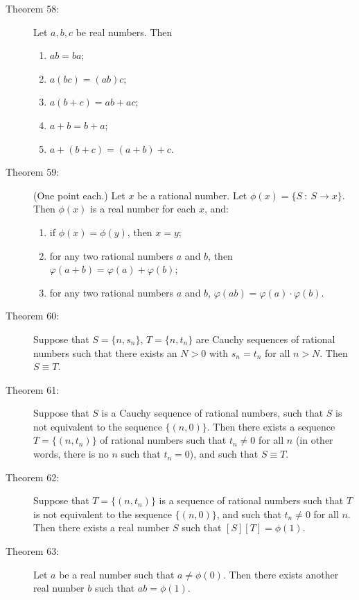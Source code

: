 \documentclass{article}
\begin{document}
\begin{description}
  \item[Theorem 58:] Let $a,b,c$ be real numbers. Then
    \begin{enumerate}[\hspace{1cm}1.]
      \item $ab=ba$; 
      \item $a(bc) = (ab)c$; 
      \item $a(b+c) = ab+ac$; 
      \item $a+b = b+a$; 
      \item $a+(b+c) = (a+b)+c$. 
    \end{enumerate}

  \item[Theorem 59:] (One point each.) Let $x$ be a rational number. Let $\phi(x) = \{ S\ :\ S \rightarrow x \}$. Then $\phi(x)$ is a real number for each $x$, and:
    \begin{enumerate}[\hspace{1cm}1.]
      \item if $\phi(x) = \phi(y)$, then $x=y$;
      \item for any two rational numbers $a$ and $b$, then $\varphi(a+b) = \varphi(a) + \varphi(b)$;
      \item for any two rational numbers $a$ and $b$, $\varphi(ab) = \varphi(a) \cdot \varphi(b)$.
    \end{enumerate}

  \item[Theorem 60:] Suppose that $S = \{ n, s_{n} \}$, $T = \{ n, t_{n} \}$ are Cauchy sequences of rational numbers such that there exists an $N > 0$ with $s_{n} = t_{n}$ for all $n > N$. Then $S \equiv T$.

  \item[Theorem 61:] Suppose that $S$ is a Cauchy sequence of rational numbers, such that $S$ is not equivalent to the sequence $\{ (n,0) \}$. Then there exists a sequence $T = \{ (n, t_{n}) \}$ of rational numbers such that $t_{n} \neq 0$ for all $n$ (in other words, there is no $n$ such that $t_{n} = 0$), and such that $S \equiv T$. 

  \item[Theorem 62:] Suppose that $T = \{ (n, t_{n}) \}$ is a sequence of rational numbers such that $T$ is not equivalent to the sequence $\{ (n,0) \}$, and such that $t_{n} \neq 0$ for all $n$. Then there exists a real number $S$ such that $[S] [T] = \phi(1)$. 

  \item[Theorem 63:] Let $a$ be a real number such that $a \neq \phi(0)$. Then there exists another real number $b$ such that $ab = \phi(1)$. 


\end{description}
\end{document}
